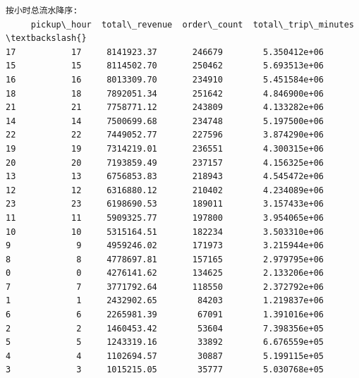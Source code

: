 \documentclass[11pt]{article}
\begin{document}
    \begin{Verbatim}[commandchars=\\\{\}]
按小时总流水降序:
     pickup\_hour  total\_revenue  order\_count  total\_trip\_minutes  \textbackslash{}
17           17     8141923.37       246679        5.350412e+06
15           15     8114502.70       250462        5.693513e+06
16           16     8013309.70       234910        5.451584e+06
18           18     7892051.34       251642        4.846900e+06
21           21     7758771.12       243809        4.133282e+06
14           14     7500699.68       234748        5.197500e+06
22           22     7449052.77       227596        3.874290e+06
19           19     7314219.01       236551        4.300315e+06
20           20     7193859.49       237157        4.156325e+06
13           13     6756853.83       218943        4.545472e+06
12           12     6316880.12       210402        4.234089e+06
23           23     6198690.53       189011        3.157433e+06
11           11     5909325.77       197800        3.954065e+06
10           10     5315164.51       182234        3.503310e+06
9             9     4959246.02       171973        3.215944e+06
8             8     4778697.81       157165        2.979795e+06
0             0     4276141.62       134625        2.133206e+06
7             7     3771792.64       118550        2.372792e+06
1             1     2432902.65        84203        1.219837e+06
6             6     2265981.39        67091        1.391016e+06
2             2     1460453.42        53604        7.398356e+05
5             5     1243319.16        33892        6.676559e+05
4             4     1102694.57        30887        5.199115e+05
3             3     1015215.05        35777        5.030768e+05


\end{Verbatim}
\end{document}

